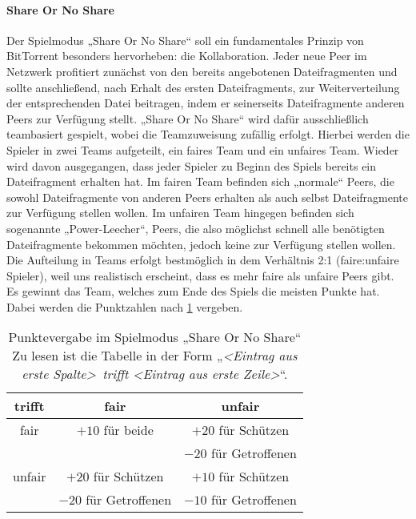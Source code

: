 \paragraph{Share Or No Share}
Der Spielmodus „Share Or No Share“ soll ein fundamentales Prinzip von BitTorrent besonders hervorheben: die Kollaboration. Jeder neue Peer im Netzwerk profitiert zunächst von den bereits angebotenen Dateifragmenten und sollte anschließend, nach Erhalt des ersten Dateifragments, zur Weiterverteilung der entsprechenden Datei beitragen, indem er seinerseits Dateifragmente anderen Peers zur Verfügung stellt.
„Share Or No Share“ wird dafür ausschließlich teambasiert gespielt, wobei die Teamzuweisung zufällig erfolgt. Hierbei werden die Spieler in zwei Teams aufgeteilt, ein faires Team und ein unfaires Team. Wieder wird davon ausgegangen, dass jeder Spieler zu Beginn des Spiels bereits ein Dateifragment erhalten hat. Im fairen Team befinden sich „normale“ Peers, die sowohl Dateifragmente von anderen Peers erhalten als auch selbst Dateifragmente zur Verfügung stellen wollen. Im unfairen Team hingegen befinden sich sogenannte „Power-Leecher“, Peers, die also möglichst schnell alle benötigten Dateifragmente bekommen möchten, jedoch keine zur Verfügung stellen wollen. Die Aufteilung in Teams erfolgt bestmöglich in dem Verhältnis 2:1 (faire:unfaire Spieler), weil uns realistisch erscheint, dass es mehr faire als unfaire Peers gibt.
Es gewinnt das Team, welches zum Ende des Spiels die meisten Punkte hat. Dabei werden die Punktzahlen nach \cref{tab:share-or-no-share-punkte} vergeben.
\begin{table}
  \centering
  \begin{tabular}{|c|c|c|}\hline
      trifft & fair & unfair \\ \hline
      fair & $+10$ für beide & $+20$ für Schützen \\
       & & $-20$ für Getroffenen \\ \hline
      unfair & $+20$ für Schützen & $+10$ für Schützen \\
       & $-20$ für Getroffenen & $-10$ für Getroffenen \\ \hline
  \end{tabular}
  \caption{Punktevergabe im Spielmodus „Share Or No Share“ \\
           \footnotesize Zu lesen ist die Tabelle in der Form „\emph{\textless Eintrag aus erste Spalte\textgreater\ trifft \textless Eintrag aus erste Zeile\textgreater}“.}
  \label{tab:share-or-no-share-punkte}
\end{table}
